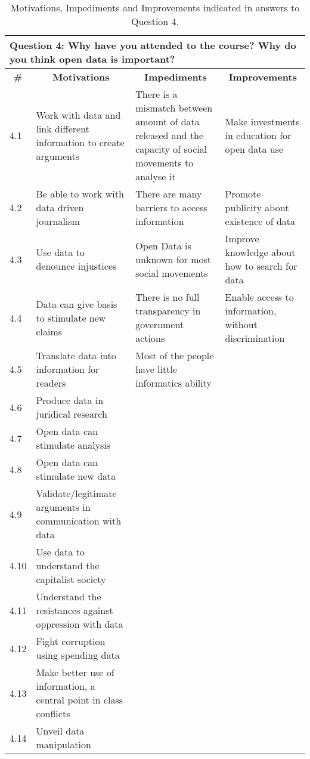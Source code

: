 \begin{table}[]
\ABNTEXfontereduzida
\caption{Motivations, Impediments and Improvements indicated in answers to Question 4.}
\label{tab:dl_results1}
\begin{tabular}{|p{1cm}|p{4.4cm}|p{4.4cm}|p{4.4cm}|}
\hline
\multicolumn{4}{|l|}{Question 4: Why have you attended to the course? Why do you think open data is important?} \\ \hline
\multicolumn{1}{|c|}{\textbf{\#}} & \multicolumn{1}{c|}{\textbf{Motivations}}                                                                       & \multicolumn{1}{c|}{\textbf{Impediments}}                                                                                                               & \multicolumn{1}{c|}{\textbf{Improvements}} \\ \hline
4.1&Work with data and link different information to create arguments&There is a mismatch between amount of data released and the capacity of social movements to analyse it &Make investments in education for open data use\\ \hline
4.2&Be able to work with data driven journalism&There are many barriers to access information&Promote publicity about existence of data\\ \hline
4.3&Use data to denounce injustices&Open Data is unknown for most social movements&Improve knowledge about how to search for data\\ \hline
4.4&Data can give basis to stimulate new claims &There is no full transparency in government actions&Enable access to information, without discrimination\\ \hline
4.5&Translate data into information for readers&Most of the people have little informatics ability&\\ \hline
4.6&Produce data in juridical research&&\\ \hline
4.7&Open data can stimulate analysis&&\\ \hline
4.8&Open data can stimulate new data&&\\ \hline
4.9&Validate/legitimate arguments in communication with data&&\\ \hline
4.10&Use data to understand the capitalist society&&\\ \hline
4.11&Understand the resistances against oppression with data&&\\ \hline
4.12&Fight corruption using spending data &&\\ \hline
4.13&Make better use of information, a central point in class conflicts&&\\ \hline
4.14&Unveil data manipulation&&\\ \hline
\end{tabular}
\end{table}



